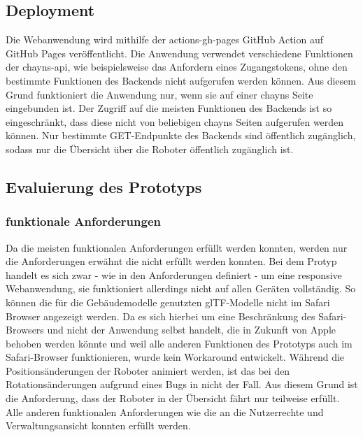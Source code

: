 \subsection{Deployment}

Die Webanwendung wird mithilfe der actions-gh-pages GitHub Action auf GitHub Pages veröffentlicht.
Die Anwendung verwendet verschiedene Funktionen der chayns-api, wie beispielsweise das Anfordern eines Zugangstokens, ohne den bestimmte Funktionen des Backends nicht aufgerufen werden können. Aus diesem Grund funktioniert die Anwendung nur, wenn sie auf einer chayns Seite eingebunden ist. Der Zugriff auf die meisten Funktionen des Backends ist so eingeschränkt, dass diese nicht von beliebigen chayns Seiten aufgerufen werden können. Nur bestimmte GET-Endpunkte des Backends sind öffentlich zugänglich, sodass nur die Übersicht über die Roboter öffentlich zugänglich ist.

\subsection{Evaluierung des Prototyps}

\subsubsection{funktionale Anforderungen}
Da die meisten funktionalen Anforderungen erfüllt werden konnten, werden nur die Anforderungen erwähnt die nicht erfüllt werden konnten. Bei dem Protyp handelt es sich zwar - wie in den Anforderungen definiert - um eine responsive Webanwendung, sie funktioniert allerdings nicht auf allen Geräten vollständig. So können die für die Gebäudemodelle genutzten \ac{glTF}-Modelle nicht im Safari Browser angezeigt werden. Da es sich hierbei um eine Beschränkung des Safari-Browsers und nicht der Anwendung selbst handelt, die in Zukunft von Apple behoben werden könnte und weil alle anderen Funktionen des Prototyps auch im Safari-Browser funktionieren, wurde kein Workaround entwickelt. Während die Positionsänderungen der Roboter animiert werden, ist das bei den Rotationsänderungen aufgrund eines Bugs in \deckgl{} nicht der Fall. Aus diesem Grund ist die Anforderung, dass der Roboter in der Übersicht fährt nur teilweise erfüllt. Alle anderen funktionalen Anforderungen wie die an die Nutzerrechte und Verwaltungsansicht konnten erfüllt werden.

